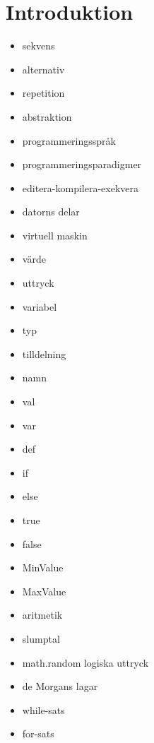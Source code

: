 \chapter{Introduktion}\label{chapter:W01}
\begin{itemize}[nosep]
\item sekvens
\item alternativ
\item repetition
\item abstraktion
\item programmeringsspråk
\item programmeringsparadigmer
\item editera-kompilera-exekvera
\item datorns delar
\item virtuell maskin
\item värde
\item uttryck
\item variabel
\item typ
\item tilldelning
\item namn
\item val
\item var
\item def
\item if
\item else
\item true
\item false
\item MinValue
\item MaxValue
\item aritmetik
\item slumptal
\item math.random logiska uttryck
\item de Morgans lagar
\item while-sats
\item for-sats
\end{itemize}